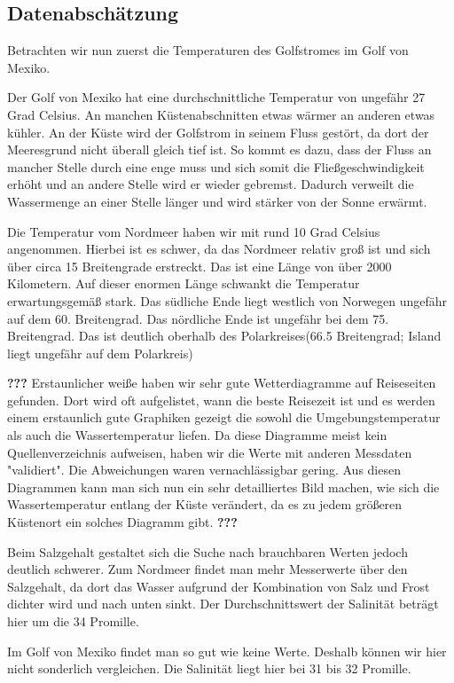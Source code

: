 \documentclass[a4paper,twoside]{article}
\begin{document}
	\subsection{Datenabschätzung}
	\noindent Betrachten wir nun zuerst die Temperaturen des Golfstromes im Golf von Mexiko. 
	
	Der Golf von Mexiko hat eine durchschnittliche Temperatur von ungefähr 27 Grad Celsius. An manchen Küstenabschnitten etwas wärmer an anderen etwas kühler. An der Küste wird der Golfstrom in seinem Fluss gestört, da dort der Meeresgrund nicht überall gleich tief ist. So kommt es dazu, dass der Fluss an mancher Stelle durch eine enge muss und sich somit die Fließgeschwindigkeit erhöht und an andere Stelle wird er wieder gebremst. Dadurch verweilt die Wassermenge an einer Stelle länger und wird stärker von der Sonne erwärmt. 
	
	Die Temperatur vom Nordmeer haben wir mit rund 10 Grad Celsius angenommen. Hierbei ist es schwer, da das Nordmeer relativ groß ist und sich über circa 15 Breitengrade erstreckt. Das ist eine Länge von über 2000 Kilometern. Auf dieser enormen Länge schwankt die Temperatur erwartungsgemäß stark. Das südliche Ende liegt westlich von Norwegen ungefähr auf dem 60. Breitengrad. Das nördliche Ende ist ungefähr bei dem 75. Breitengrad. Das ist deutlich oberhalb des Polarkreises(66.5 Breitengrad; Island liegt ungefähr auf dem Polarkreis)
	
	
	\textbf{???} Erstaunlicher weiße haben wir sehr gute Wetterdiagramme auf Reiseseiten gefunden. Dort wird oft aufgelistet, wann die beste Reisezeit ist und es werden einem erstaunlich gute Graphiken gezeigt die sowohl die Umgebungstemperatur als auch die Wassertemperatur liefen. Da diese Diagramme meist kein Quellenverzeichnis aufweisen, haben wir die Werte mit anderen Messdaten "validiert". Die Abweichungen waren vernachlässigbar gering. Aus diesen Diagrammen kann man sich nun ein sehr detailliertes Bild machen, wie sich die Wassertemperatur entlang der Küste verändert, da es zu jedem größeren Küstenort ein solches Diagramm gibt. \textbf{???}
	
	
	Beim Salzgehalt gestaltet sich die Suche nach brauchbaren Werten jedoch deutlich schwerer. Zum Nordmeer findet man mehr Messerwerte über den Salzgehalt, da dort das Wasser aufgrund der Kombination von Salz und Frost dichter wird und nach unten sinkt. Der Durchschnittswert der Salinität beträgt hier um die 34 Promille. 
	
	Im Golf von Mexiko findet man so gut wie keine Werte. Deshalb können wir hier nicht sonderlich vergleichen. Die Salinität liegt hier bei 31 bis 32 Promille.
	
\end{document}
